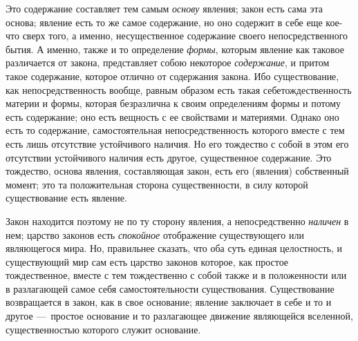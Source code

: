 Это содержание составляет тем самым {\em основу}
явления; закон есть сама эта основа; явление есть то же самое содержание,
но оно содержит в себе еще кое-что сверх того, а именно, несущественное
содержание своего непосредственного бытия. А именно, также и то определение
{\em формы}, которым явление как таковое различается от
закона, представляет собою некоторое {\em содержание},
и притом такое содержание, которое отлично от содержания закона. Ибо
существование, как непосредственность вообще, равным образом есть такая
себетождественность материи и формы, которая безразлична к своим
определениям формы и потому есть содержание; оно есть вещность с ее
свойствами и материями. Однако оно есть то содержание, самостоятельная
непосредственность которого вместе с тем есть лишь отсутствие устойчивого
наличия. Но его тождество с собой в этом его отсутствии устойчивого наличия
есть другое, существенное содержание. Это тождество, основа явления,
составляющая закон, есть его (явления) собственный момент; это та
положительная сторона существенности, в силу которой существование есть
явление.

Закон находится поэтому не по ту сторону явления, а непосредственно
{\em наличен} в нем; царство законов есть
{\em спокойное} отображение существующего или
являющегося мира. Но, правильнее сказать, что оба суть единая целостность,
и существующий мир сам есть царство законов которое, как простое
тождественное, вместе с тем тождественно с собой также и в положенности или
в разлагающей самое себя самостоятельности существования. Существование
возвращается в закон, как в свое основание; явление заключает в себе и то и
другое —~простое основание и то разлагающее движение являющейся вселенной,
существенностью которого служит основание.

